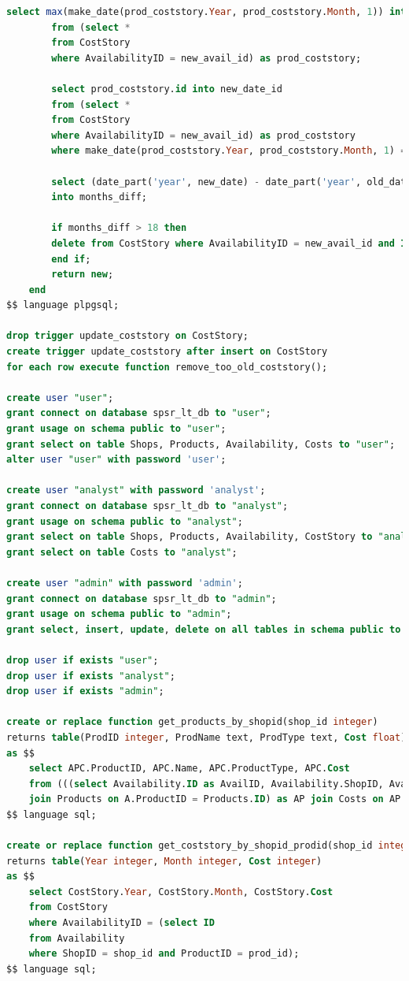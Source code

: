 \documentclass[a4paper,14pt]{extreport}
\begin{document}
\begin{lstlisting}[language=sql, caption={Сценарий создания БД}]
		select max(make_date(prod_coststory.Year, prod_coststory.Month, 1)) into new_date
		from (select * 
		from CostStory 
		where AvailabilityID = new_avail_id) as prod_coststory;
		
		select prod_coststory.id into new_date_id
		from (select * 
		from CostStory 
		where AvailabilityID = new_avail_id) as prod_coststory
		where make_date(prod_coststory.Year, prod_coststory.Month, 1) = new_date;
		
		select (date_part('year', new_date) - date_part('year', old_date)) * 12 + (date_part('month', new_date) - date_part('month', old_date)) + 1
		into months_diff;
		
		if months_diff > 18 then
		delete from CostStory where AvailabilityID = new_avail_id and ID = old_date_id;
		end if;
		return new;
	end
$$ language plpgsql;

drop trigger update_coststory on CostStory;
create trigger update_coststory after insert on CostStory
for each row execute function remove_too_old_coststory();

create user "user";
grant connect on database spsr_lt_db to "user";
grant usage on schema public to "user";
grant select on table Shops, Products, Availability, Costs to "user";
alter user "user" with password 'user';

create user "analyst" with password 'analyst';
grant connect on database spsr_lt_db to "analyst";
grant usage on schema public to "analyst";
grant select on table Shops, Products, Availability, CostStory to "analyst";
grant select on table Costs to "analyst";

create user "admin" with password 'admin';
grant connect on database spsr_lt_db to "admin";
grant usage on schema public to "admin";
grant select, insert, update, delete on all tables in schema public to "admin";

drop user if exists "user";
drop user if exists "analyst";
drop user if exists "admin";

create or replace function get_products_by_shopid(shop_id integer)
returns table(ProdID integer, ProdName text, ProdType text, Cost float)
as $$
	select APC.ProductID, APC.Name, APC.ProductType, APC.Cost
	from (((select Availability.ID as AvailID, Availability.ShopID, Availability.ProductID from Availability where Availability.ShopID = shop_id) as A 
	join Products on A.ProductID = Products.ID) as AP join Costs on AP.AvailID = Costs.AvailabilityID) as APC;
$$ language sql;

create or replace function get_coststory_by_shopid_prodid(shop_id integer, prod_id integer)
returns table(Year integer, Month integer, Cost integer)
as $$
	select CostStory.Year, CostStory.Month, CostStory.Cost
	from CostStory
	where AvailabilityID = (select ID
	from Availability
	where ShopID = shop_id and ProductID = prod_id);
$$ language sql;


\end{lstlisting}
\end{document}

